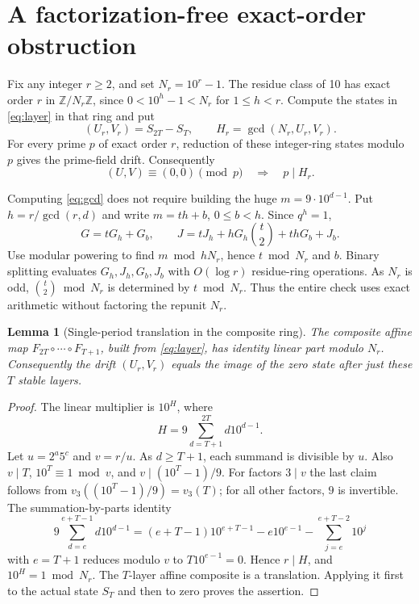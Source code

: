 \documentclass[10pt]{article}
\newtheorem{lemma}{Lemma}
\begin{document}
\section{A factorization-free exact-order obstruction}
Fix any integer \(r\ge2\), and set \(N_r=10^r-1\).
The residue class of 10 has exact order \(r\) in
\(\mathbb Z/N_r\mathbb Z\), since \(0<10^h-1<N_r\)
for \(1\le h<r\).
Compute the states in \eqref{eq:layer} in that ring and put
\begin{equation}
 (U_r,V_r)=S_{2T}-S_T,\qquad
 H_r=\gcd(N_r,U_r,V_r).
 \label{eq:gcd}
\end{equation}
For every prime \(p\) of exact order \(r\),
reduction of these integer-ring states modulo \(p\)
gives the prime-field drift. Consequently
\begin{equation}
 (U,V)\equiv(0,0)\pmod p
 \quad\Longrightarrow\quad p\mid H_r.
 \label{eq:obstruction}
\end{equation}

Computing \eqref{eq:gcd} does not require building the huge
\(m=9\cdot10^{d-1}\). Put \(h=r/\gcd(r,d)\) and
write \(m=th+b\), \(0\le b<h\). Since \(q^h=1\),
\[
 G=tG_h+G_b,\qquad
 J=tJ_h+hG_h\binom{t}{2}+thG_b+J_b.
\]
Use modular powering to find
\(m\bmod hN_r\), hence \(t\bmod N_r\) and \(b\).
Binary splitting evaluates \(G_h,J_h,G_b,J_b\)
with \(O(\log r)\) residue-ring operations.
As \(N_r\) is odd, \(\binom t2\bmod N_r\)
is determined by \(t\bmod N_r\).
Thus the entire check uses exact arithmetic without
factoring the repunit \(N_r\).

\begin{lemma}[Single-period translation in the composite ring]
The composite affine map
\(F_{2T}\circ\cdots\circ F_{T+1}\), built from
\eqref{eq:layer}, has identity linear part modulo \(N_r\).
Consequently the drift \((U_r,V_r)\) equals the image
of the zero state after just these \(T\) stable layers.
\end{lemma}
\begin{proof}
The linear multiplier is \(10^H\), where
\[
H=9\sum_{d=T+1}^{2T}d10^{d-1}.
\]
Let \(u=2^a5^c\) and \(v=r/u\). As \(d\ge T+1\),
each summand is divisible by \(u\).
Also \(v\mid T\), \(10^T\equiv1\bmod v\), and
\(v\mid(10^T-1)/9\). For factors \(3\mid v\)
the last claim follows from
\(v_3((10^T-1)/9)=v_3(T)\); for all other factors,
\(9\) is invertible. The summation-by-parts identity
\[
9\sum_{d=e}^{e+T-1}d10^{d-1}
=(e+T-1)10^{e+T-1}-e10^{e-1}
-\sum_{j=e}^{e+T-2}10^j
\]
with \(e=T+1\) reduces modulo \(v\) to
\(T10^{e-1}=0\). Hence \(r\mid H\), and
\(10^H=1\bmod N_r\).
The \(T\)-layer affine composite is a translation.
Applying it first to the actual state \(S_T\)
and then to zero proves the assertion.
\end{proof}
\end{document}
